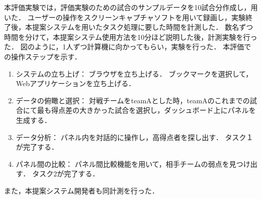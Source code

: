 \documentclass[sotsuron]{kuee}
\begin{document}
					本評価実験では，評価実験のための試合のサンプルデータを10試合分作成し，用いた．
					ユーザーの操作をスクリーンキャプチャソフトを用いて録画し，実験終了後，本提案システムを用いたタスク処理に要した時間を計測した．
					数名ずつ時間を分けて，本提案システム使用方法を10分ほど説明した後，計測実験を行った．
					図のように，1人ずつ計算機に向かってもらい，実験を行った．
					本評価での操作ステップを示す．
					\begin{enumerate}
						\item システムの立ち上げ：
							ブラウザを立ち上げる．
							ブックマークを選択して，Webアプリケーションを立ち上げる．
						\item データの俯瞰と選択：
							対戦チームをteamAとした時，teamAのこれまでの試合にて最も得点差の大きかった試合を選択し，ダッシュボード上にパネルを生成する．
						\item データ分析：
							パネル内を対話的に操作し，高得点者を探し出す．
							タスク１が完了する．
						\item パネル間の比較：
							パネル間比較機能を用いて，相手チームの弱点を見つけ出す．
							タスク2が完了する．
					\end{enumerate}
					また，本提案システム開発者も同計測を行った．
\end{document}
